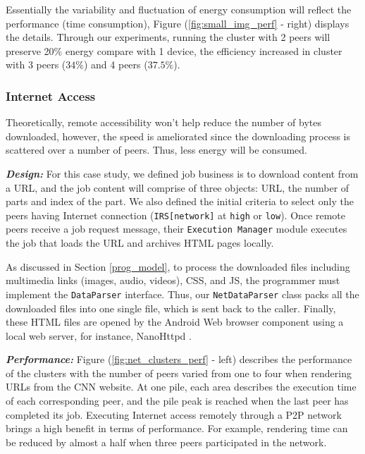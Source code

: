 \documentclass{sig-alternate}
\begin{document}
Essentially the variability and fluctuation of energy consumption will reflect the performance (time consumption), Figure (\ref{fig:small_img_perf} - right) displays the details. Through our experiments, running the cluster with 2 peers will preserve 20\% energy compare with 1 device, the efficiency increased in cluster with 3 peers ($34\%$) and 4 peers ($37.5\%$).


\subsubsection{Internet Access} 
Theoretically, remote accessibility won't help reduce the number of bytes downloaded, however, the speed is ameliorated since the downloading process is scattered over a number of peers. Thus, less energy will be consumed. 

\textbf{\emph{Design:}}
For this case study, we defined job business is to download content from a URL, and the job content will comprise of three objects: URL, the number of parts and index of the part. We also defined the initial criteria to select only the peers having Internet connection (\texttt{IRS[network]} at \texttt{high} or \texttt{low}). Once remote peers receive a job request message, their \texttt{Execution Manager} module executes the job that loads the URL and archives HTML pages locally. 

As discussed in Section \ref{prog_model}, to process the downloaded files including multimedia links (images, audio, videos), CSS, and JS, the programmer must implement the \texttt{DataParser} interface. Thus, our \texttt{NetDataParser} class packs all the downloaded files into one single file, which is sent back to the caller. Finally, these HTML files are opened by the Android Web browser component using a local web server, for instance, NanoHttpd \cite{nanohttpd}.

\textbf{\emph{Performance:}}
Figure (\ref{fig:net_clusters_perf} - left) describes the performance of the clusters with the number of peers varied from one to four when rendering URLs from the CNN website. At one pile, each area describes the execution time of each corresponding peer, and the pile peak is reached when the last peer has completed its job. Executing Internet access remotely through a P2P network brings a high benefit in terms of performance. For example, rendering time can be reduced by almost a half when three peers participated in the network. 
\end{document}
